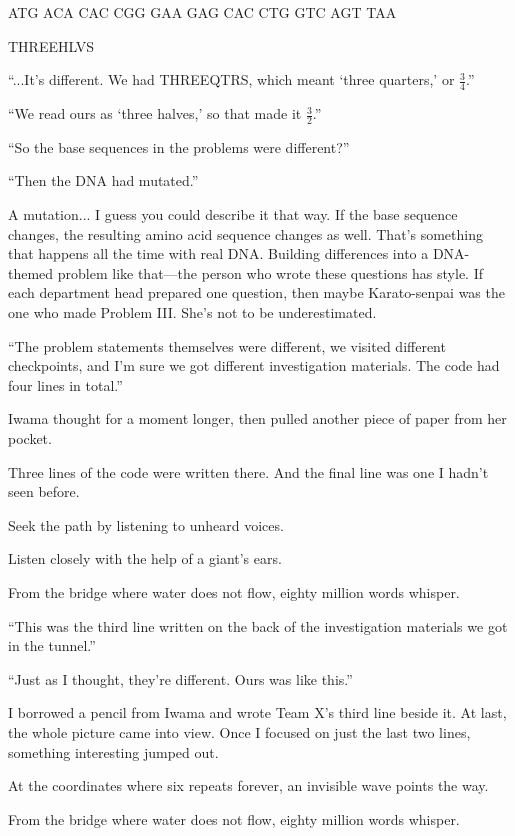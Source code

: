 \documentclass[
    a4paper,
    12pt,
    twoside,
    openany,
    UTF8,
    fontset=windows
]{ctexbook}
\begin{document}
\begin{center}
ATG ACA CAC CGG GAA GAG CAC CTG GTC AGT TAA

THREEHLVS
\end{center}

``...It's different. We had THREEQTRS, which meant `three quarters,' or $\frac{3}{4}$.''

``We read ours as `three halves,' so that made it $\frac{3}{2}$.''

``So the base sequences in the problems were different?''

``Then the DNA had mutated.''

A mutation... I guess you could describe it that way. If the base sequence changes, the resulting amino acid sequence changes as well. That's something that happens all the time with real DNA. Building differences into a DNA-themed problem like that---the person who wrote these questions has style. If each department head prepared one question, then maybe Karato-senpai was the one who made Problem III. She's not to be underestimated.

``The problem statements themselves were different, we visited different checkpoints, and I'm sure we got different investigation materials. The code had four lines in total.''

Iwama thought for a moment longer, then pulled another piece of paper from her pocket.

Three lines of the code were written there. And the final line was one I hadn't seen before.

\begin{center}
Seek the path by listening to unheard voices.

Listen closely with the help of a giant's ears.

From the bridge where water does not flow, eighty million words whisper.
\end{center}

``This was the third line written on the back of the investigation materials we got in the tunnel.''

``Just as I thought, they're different. Ours was like this.''

I borrowed a pencil from Iwama and wrote Team X's third line beside it. At last, the whole picture came into view. Once I focused on just the last two lines, something interesting jumped out.

\begin{center}
At the coordinates where six repeats forever, an invisible wave points the way.

From the bridge where water does not flow, eighty million words whisper.
\end{center}
\end{document}
